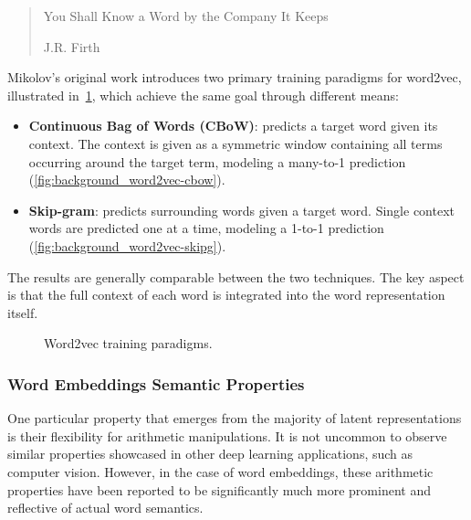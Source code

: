 \blockquote[J.R. Firth]{You Shall Know a Word by the Company It Keeps}

Mikolov's original work introduces two primary training paradigms for word2vec, illustrated in~\cref{fig:background_word2vec-cbow_word2vec-skipg}, which achieve the same goal through different means:
\begin{itemize}
    \item \textbf{Continuous Bag of Words (CBoW)}: predicts a target word given its context.
The context is given as a symmetric window containing all terms occurring around the target term, modeling a many-to-1 prediction (\cref{fig:background_word2vec-cbow}).
    \item \textbf{Skip-gram}: predicts surrounding words given a target word.
Single context words are predicted one at a time, modeling a 1-to-1 prediction (\cref{fig:background_word2vec-skipg}).
\end{itemize}
The results are generally comparable between the two techniques.
The key aspect is that the full context of each word is integrated into the word representation itself.

\begin{figure}[t!]
    \centering
    \quad
    \caption{Word2vec training paradigms.}
    \label{fig:background_word2vec-cbow_word2vec-skipg}
\end{figure}

\subsubsection*{Word Embeddings Semantic Properties}

One particular property that emerges from the majority of latent representations is their flexibility for arithmetic manipulations.
It is not uncommon to observe similar properties showcased in other deep learning applications, such as computer vision.
However, in the case of word embeddings, these arithmetic properties have been reported to be significantly much more prominent and reflective of actual word semantics.

